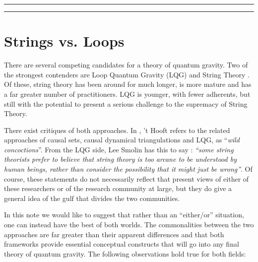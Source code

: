 \documentclass[submission, Phys]{SciPost}
\begin{document}
\vspace{10pt}
\noindent\rule{\textwidth}{1pt}
\tableofcontents\thispagestyle{fancy}
\noindent\rule{\textwidth}{1pt}
\vspace{10pt}


\section{Strings vs. Loops}\label{sec:comparison}

There are several competing candidates for a theory of quantum gravity. Two of the strongest contenders are Loop Quantum Gravity (LQG) \cite{Ashtekar1991Lectures, Rovelli2011Zakopane, Ashtekar2004Background} and String Theory \cite{Tong2010Lectures,Zwiebach2009A-First,Polchinski1998aString}. Of these, string theory has been around for much longer, is more mature and has a far greater number of practitioners. LQG is younger, with fewer adherents, but still with the potential to present a serious challenge to the supremacy of String Theory.

There exist critiques of both approaches. In \cite[Sec. 4, pg 6]{t-Hooft2016Natures}, 't Hooft refers to the related approaches of causal sets, causal dynamical triangulations and LQG, as ``\emph{wild concoctions}''. From the LQG side, Lee Smolin has this to say \cite{Smolin2006The-trouble}: \emph{``some string theorists prefer to believe that string theory is too arcane to be understood by human beings, rather than consider the possibility that it might just be wrong''}. Of course, these statements do not necessarily reflect that present views of either of these researchers or of the research community at large, but they do give a general idea of the gulf that divides the two communities.

In this note we would like to suggest that rather than an ``either/or'' situation, one can instead have the best of both worlds. The commonalities between the two approaches are far greater than their apparent differences and that both frameworks provide essential conceptual constructs that will go into any final theory of quantum gravity. The following observations hold true for both fields:
\end{document}

